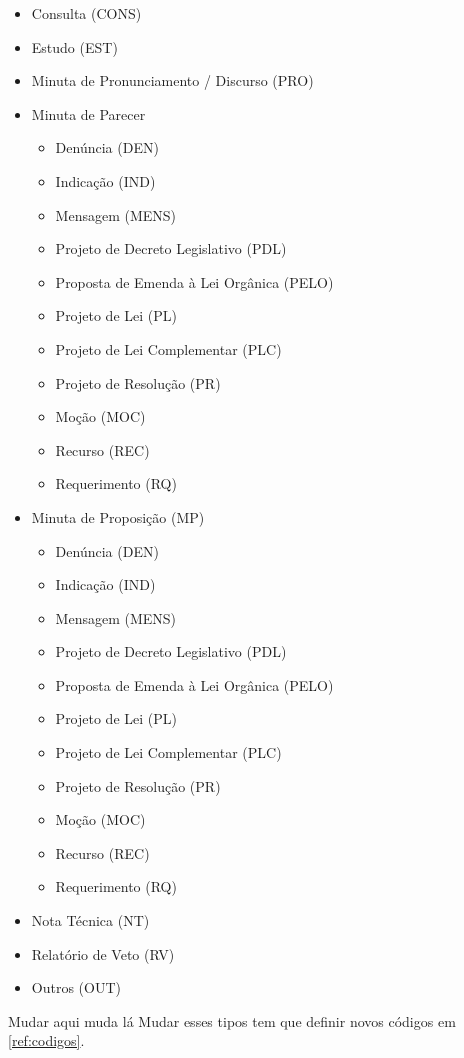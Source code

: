 \begin{itemize}
	\item Consulta (CONS)
	\item Estudo (EST)
	\item Minuta de Pronunciamento / Discurso (PRO)
	\item Minuta de Parecer
	\begin{itemize}
		\item Denúncia (DEN)
		\item Indicação (IND)
		\item Mensagem (MENS) 
		\item Projeto de Decreto Legislativo (PDL)
		\item Proposta de Emenda à Lei Orgânica (PELO)
		\item Projeto de Lei (PL)
		\item Projeto de Lei Complementar (PLC) 
		\item Projeto de Resolução (PR)
		\item Moção (MOC)
		\item Recurso (REC)
		\item Requerimento (RQ)		
    \end{itemize}


	\item Minuta de Proposição (MP)
	\begin{itemize}
		\item Denúncia (DEN)
		\item Indicação (IND)
		\item Mensagem (MENS) 
		\item Projeto de Decreto Legislativo (PDL)
		\item Proposta de Emenda à Lei Orgânica (PELO)
		\item Projeto de Lei (PL)
		\item Projeto de Lei Complementar (PLC) 
		\item Projeto de Resolução (PR)
		\item Moção (MOC)
		\item Recurso (REC)
		\item Requerimento (RQ)		
    \end{itemize}

	\item Nota Técnica (NT)
	\item Relatório de Veto (RV)
	\item Outros (OUT)
\end{itemize}

\begin{importante}{Mudar aqui muda lá}
	Mudar esses tipos tem que definir novos códigos em \ref{ref:codigos}.
\end{importante}

